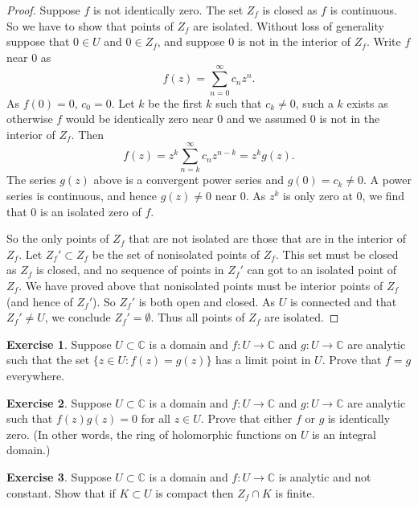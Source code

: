 \documentclass[12pt,openany]{book}
\newcommand{\C}{{\mathbb{C}}}
\theoremstyle{plain}
\theoremstyle{remark}
\theoremstyle{definition}
\newenvironment{exbox}{%
    \def\FrameCommand{\vrule width 1pt \relax\hspace {10pt}}%
    \MakeFramed {\advance \hsize -\width \FrameRestore }%
}{%
    \endMakeFramed
}
\theoremstyle{exercise}
\newtheorem{exercise}{Exercise}[section]
\theoremstyle{example}
\begin{document}
\begin{proof}
Suppose $f$ is not identically zero.
The set $Z_f$ is closed as $f$ is continuous.  So we have to show
that points of $Z_f$ are isolated.
Without loss of generality suppose that $0 \in U$ and $0 \in Z_f$,
and suppose $0$ is not in the interior of $Z_f$.
Write $f$ near $0$ as
\begin{equation*}
f(z) = \sum_{n=0}^\infty c_n z^n .
\end{equation*}
As $f(0) = 0$, $c_0 =0$.  Let $k$ be the first $k$ such that $c_k \not=0$,
such a $k$ exists as otherwise $f$ would be identically zero near $0$
and we assumed $0$ is not in the interior of $Z_f$.  Then
\begin{equation*}
f(z) = z^k \sum_{n=k}^\infty c_n z^{n-k} = z^k g(z) .
\end{equation*}
The series $g(z)$ above is a convergent power series and $g(0) = c_k \not=
0$.  A power series is continuous, and hence $g(z) \not= 0$ near $0$.
As $z^k$ is only zero at $0$, we find that $0$ is an isolated zero of $f$.

So the only points of $Z_f$ that are not isolated are those that are in the
interior of $Z_f$.  Let $Z_f' \subset Z_f$ be the set of nonisolated points
of $Z_f$.  This set must be closed as $Z_f$ is closed, and no sequence
of points in $Z_f'$ can
got to an isolated point of $Z_f$.  We have proved above that nonisolated
points must be interior points of $Z_f$ (and hence of $Z_f'$).
So $Z_f'$ is both open and closed.  As $U$ is connected and 
that $Z_f' \not= U$, we conclude $Z_f' = \emptyset$.
Thus all points of $Z_f$ are isolated.
\end{proof}

\begin{exbox}
\begin{exercise}
Suppose $U \subset \C$ is a domain and $f \colon U \to \C$ and $g \colon U \to
\C$ are
analytic such that the set $\{ z \in U : f(z) = g(z) \}$ has a limit
point in $U$.  Prove that $f = g$ everywhere.
\end{exercise}

\begin{exercise}
Suppose $U \subset \C$ is a domain and $f \colon U \to \C$ and $g \colon U \to
\C$ are analytic such that $f(z)g(z) = 0$ for all $z \in U$.
Prove that either $f$ or $g$ is identically zero.
(In other words, the ring of holomorphic functions on $U$ is an integral
domain.)
\end{exercise}

\begin{exercise}
Suppose $U \subset \C$ is a domain and $f \colon U \to \C$ is
analytic and not constant.  Show that if $K \subset U$ is compact
then $Z_f \cap K$ is finite.
\end{exercise}
\end{exbox}
\end{document}

